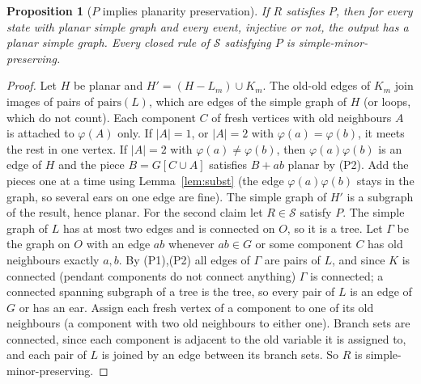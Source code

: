 \documentclass[10pt]{article}
\theoremstyle{definition}
\theoremstyle{plain}
\newtheorem{proposition}[theorem]{Proposition}
\theoremstyle{remark}
\begin{document}
\begin{proposition}[$P$ implies planarity preservation]\label{prop:Pplanar}
If $R$ satisfies $P$, then for every state with planar simple graph and every event, injective or not, the output has a planar simple graph. Every closed rule of $\mathcal S$ satisfying $P$ is simple-minor-preserving.
\end{proposition}
\begin{proof}
Let $H$ be planar and $H'=(H-L_m)\cup K_m$. The old-old edges of $K_m$ join images of pairs of $\mathrm{pairs}(L)$, which are edges of the simple graph of $H$ (or loops, which do not count). Each component $C$ of fresh vertices with old neighbours $A$ is attached to $\varphi(A)$ only. If $|A|=1$, or $|A|=2$ with $\varphi(a)=\varphi(b)$, it meets the rest in one vertex. If $|A|=2$ with $\varphi(a)\neq\varphi(b)$, then $\varphi(a)\varphi(b)$ is an edge of $H$ and the piece $B=G[C\cup A]$ satisfies $B+ab$ planar by (P2). Add the pieces one at a time using Lemma~\ref{lem:subst} (the edge $\varphi(a)\varphi(b)$ stays in the graph, so several ears on one edge are fine). The simple graph of $H'$ is a subgraph of the result, hence planar.
For the second claim let $R\in\mathcal S$ satisfy $P$. The simple graph of $L$ has at most two edges and is connected on $O$, so it is a tree. Let $\Gamma$ be the graph on $O$ with an edge $ab$ whenever $ab\in G$ or some component $C$ has old neighbours exactly $a,b$. By (P1),(P2) all edges of $\Gamma$ are pairs of $L$, and since $K$ is connected (pendant components do not connect anything) $\Gamma$ is connected; a connected spanning subgraph of a tree is the tree, so every pair of $L$ is an edge of $G$ or has an ear. Assign each fresh vertex of a component to one of its old neighbours (a component with two old neighbours to either one). Branch sets are connected, since each component is adjacent to the old variable it is assigned to, and each pair of $L$ is joined by an edge between its branch sets. So $R$ is simple-minor-preserving.
\end{proof}
\end{document}
